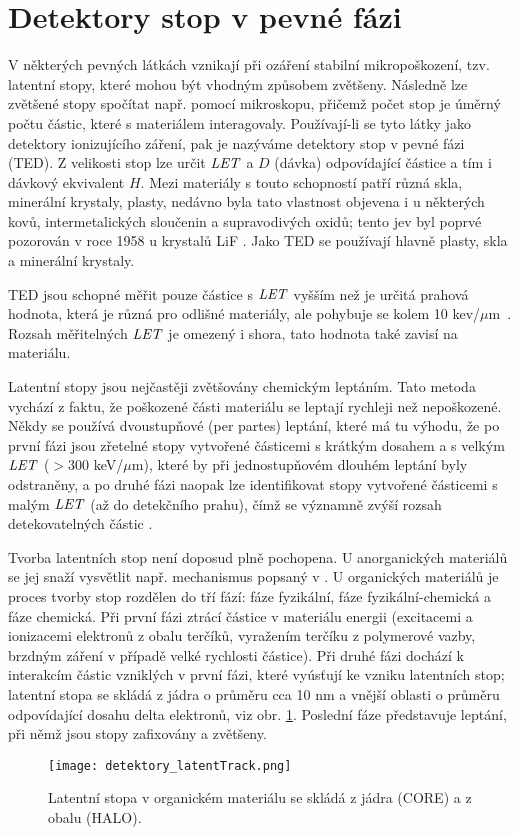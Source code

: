 \section{Detektory stop v pevné fázi}
V některých pevných látkách vznikají při ozáření stabilní mikropoškození, tzv. latentní stopy, které mohou být vhodným způsobem zvětšeny. Následně lze zvětšené stopy spočítat např. pomocí mikroskopu, přičemž počet stop je úměrný počtu částic, které s materiálem interagovaly. Používají-li se tyto látky jako detektory ionizujícího záření, pak je nazýváme detektory stop v pevné fázi (TED). Z velikosti stop lze určit $\mathit{LET}$ a $D$ (dávka) odpovídající částice a tím i dávkový ekvivalent $H$. Mezi materiály s touto schopností patří různá skla, minerální krystaly, plasty, nedávno byla tato vlastnost objevena i u některých kovů, intermetalických sloučenin a supravodivých oxidů; tento jev byl poprvé pozorován v roce 1958 u krystalů LiF \cite{objevTED}. Jako TED
se používají hlavně plasty, skla a minerální krystaly.

TED jsou schopné měřit pouze částice s $\mathit{LET}$ vyšším než je určitá prahová hodnota, která je různá pro odlišné materiály, ale pohybuje se kolem 10 kev/$\mu$m~\cite{ambrozova_dvaExperimenty}. Rozsah měřitelných $\mathit{LET}$ je omezený i shora, tato hodnota také zavisí na materiálu.  

Latentní stopy jsou nejčastěji zvětšovány chemickým leptáním. Tato metoda vychází z faktu, že poškozené části materiálu se leptají rychleji než nepoškozené. Někdy se používá dvoustupňové (per partes) leptání, které má tu výhodu, že po první fázi jsou zřetelné stopy vytvořené částicemi s krátkým dosahem a s velkým $\mathit{LET}$ ($> 300$ keV/$\mu$m), které by při jednostupňovém dlouhém leptání byly odstraněny, a po druhé fázi naopak lze identifikovat stopy vytvořené částicemi s malým $\mathit{LET}$ (až do detekčního prahu), čímž se významně zvýší rozsah detekovatelných částic \cite{cesky}. 

Tvorba latentních stop není doposud plně pochopena. U anorganických materiálů se jej snaží vysvětlit např. mechanismus popsaný v \cite{spikeModel}. U organických materiálů je proces tvorby stop rozdělen do tří fází: fáze fyzikální, fáze fyzikální-chemická a fáze chemická. Při první fázi ztrácí částice v materiálu energii (excitacemi a ionizacemi elektronů z obalu terčíků, vyražením terčíku z polymerové vazby, brzdným záření v případě velké rychlosti částice). Při druhé fázi dochází k interakcím částic vzniklých v první fázi, které vyúsťují ke vzniku latentních stop; latentní stopa se skládá z jádra o průměru cca 10 nm a vnější oblasti o průměru odpovídající dosahu delta elektronů, viz obr. \ref{fig:detektory_latentTrack}. Poslední fáze představuje leptání, při němž jsou stopy zafixovány
a zvětšeny.~\cite{thesisKPBrabcova} 
\begin{figure}[h]
  \centering
  \texttt{[image: detektory\_latentTrack.png]}
  \caption{Latentní stopa v organickém materiálu se skládá z jádra (CORE) a z obalu (HALO). \cite{thesisKPBrabcova}}
  \label{fig:detektory_latentTrack}
\end{figure}

